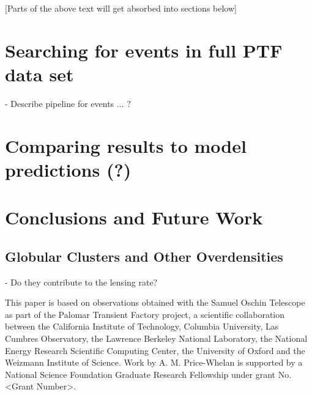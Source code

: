 \documentclass[12pt,preprint]{aastex}
\begin{document}
%
%
%

[Parts of the above text will get absorbed into sections below]

\section{Searching for events in full PTF data set}
- Describe pipeline for events ... ?

\section{Comparing results to model predictions (?)}

\section{Conclusions and Future Work}
\subsection{Globular Clusters and Other Overdensities}
- Do they contribute to the lensing rate?

\acknowledgments
This paper is based on observations obtained with the Samuel Oschin Telescope as part of the Palomar Transient Factory project, a scientific collaboration between the California Institute of Technology, Columbia University, Las Cumbres Observatory, the Lawrence Berkeley National Laboratory, the National Energy Research Scientific Computing Center, the University of Oxford and the Weizmann Institute of Science. Work by A. M. Price-Whelan is supported by a National Science Foundation Graduate Research Fellowship under grant No. <Grant Number>.
\end{document}
